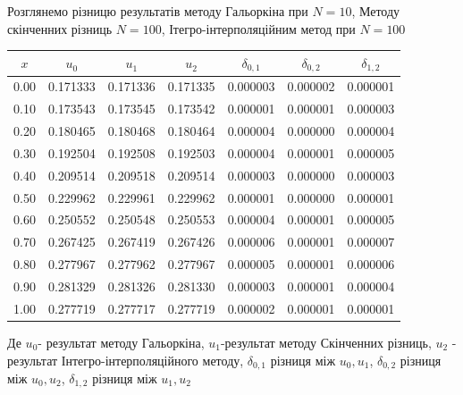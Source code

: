 \documentclass[14pt,a4paper]{scrartcl}
\begin{document}
	Розглянемо різницю результатів методу Гальоркіна при $N=10$, Методу скінченних різниць $N=100$, Ітегро-інтерполяційним метод при $N=100$
	
	
		\begin{center}
		\begin{tabular}{ | c | c | c | c | c | c | c |  }
			\hline
			$x$ & $u_0$ & $u_1$ & $u_2$ & $\delta_{0,1}$ & $\delta_{0,2}$ & $\delta_{1,2}$\\ \hline
			0.00 & 0.171333 & 0.171336 & 0.171335 & 0.000003 & 0.000002 & 0.000001\\
			0.10 & 0.173543 & 0.173545 & 0.173542 & 0.000001 & 0.000001 & 0.000003\\
			0.20 & 0.180465 & 0.180468 & 0.180464 & 0.000004 & 0.000000 & 0.000004\\
			0.30 & 0.192504 & 0.192508 & 0.192503 & 0.000004 & 0.000001 & 0.000005\\
			0.40 & 0.209514 & 0.209518 & 0.209514 & 0.000003 & 0.000000 & 0.000003\\
			0.50 & 0.229962 & 0.229961 & 0.229962 & 0.000001 & 0.000000 & 0.000001\\
			0.60 & 0.250552 & 0.250548 & 0.250553 & 0.000004 & 0.000001 & 0.000005\\
			0.70 & 0.267425 & 0.267419 & 0.267426 & 0.000006 & 0.000001 & 0.000007\\
			0.80 & 0.277967 & 0.277962 & 0.277967 & 0.000005 & 0.000001 & 0.000006\\
			0.90 & 0.281329 & 0.281326 & 0.281330 & 0.000003 & 0.000001 & 0.000004\\
			1.00 & 0.277719 & 0.277717 & 0.277719 & 0.000002 & 0.000001 & 0.000001\\
			\hline
		\end{tabular}
	\end{center}
	
	Де $u_0$- результат методу Гальоркіна, $u_1$-результат методу Скінченних різниць, $u_2$ - результат Інтегро-інтерполяційного методу,  $\delta_{0,1}$ різниця між $u_{0}, u_{1}$,  $\delta_{0,2}$ різниця між $u_{0}, u_{2}$,  $\delta_{1,2}$ різниця між $u_{1}, u_{2}$
\end{document}
